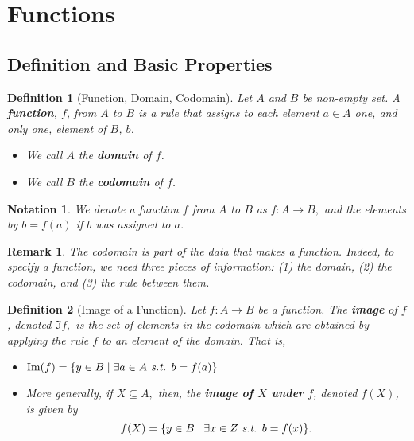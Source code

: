 \documentclass[12pt,a4paper]{article}
\newtheorem{nota}{Notation}[section]
\newtheorem{df}{Definition}[subsection]
\newtheorem*{rmk}{\indent Remark}
\def\st{\emph{ s.t. }}
\begin{document}
\newpage
\section{Functions}
\subsection{Definition and Basic Properties}
\begin{df}[Function, Domain, Codomain]
	Let $A$ and $B$ be non-empty set. A \textbf{function}, $f$, from $A$ to $B$ is a rule that assigns to each element $a\in A$ one, and only one, element of $B$, $b$.
	\begin{itemize}
		\item We call $A$ the \textbf{domain} of $f$.
		\item We call $B$ the \textbf{codomain} of $f$.
	\end{itemize}
\end{df}
\begin{nota}
	We denote a function $f$ from $A$ to $B$ as $f: A\to B,$ and the elements by $b=f(a)$ if $b$ was assigned to $a$. 	
\end{nota}
\begin{rmk}
	The codomain is part of the data that makes a function. Indeed, to specify a function, we need three pieces of information: (1) the domain, (2) the codomain, and (3) the rule between them. 
\end{rmk}
\begin{df}[Image of a Function]
	Let $f:A\to B$ be a function. The \textbf{image} of $f$, denoted $\Im{f},$ is the set of elements in the codomain which are obtained by applying the rule $f$ to an element of the domain. That is, 
	\begin{itemize}
		\item $\Im(f)=\qty{y\in B\mid\exists a\in A\st b=f(a)}$
		\item More generally, if $X\subseteq A,$ then, the \textbf{image of $X$ under }$f$, denoted $f(X)$, is given by \[f(X)=\qty{y\in B\mid\exists x\in Z\st b=f(x)}.\]
	\end{itemize}	
\end{df}
\end{document}

